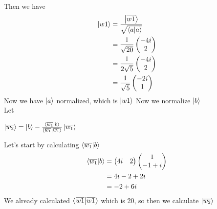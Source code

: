 \documentclass{article}
\begin{document}
Then we have\\
\begin{align*}
\ket{w1} &= \frac{\ket{\overline{w1}}}{\sqrt{\bra{a}\ket{a}}}\\
&= \frac{1}{\sqrt{20}}\begin{pmatrix} -4i \\ 2\end{pmatrix}\\
&= \frac{1}{2\sqrt{5}}\begin{pmatrix} -4i \\ 2\end{pmatrix}\\
&= \frac{1}{\sqrt{5}}\begin{pmatrix} -2i \\ 1\end{pmatrix}\\
\end{align*}
Now we have $\ket{a}$ normalized, which is $\ket{w1}$ Now we normalize $\ket{b}$\\
Let\\
\begin{center}
$\ket{\overline{w_2}} = \ket{b} - \frac{\bra{\overline{w_1}}\ket{b}}{\bra{\overline{w_1}}\ket{\overline{w_1}}} \ket{\overline{w_1}}$
\end{center}
Let's start by calculating $\bra{\overline{w_1}}\ket{b}$\\
\begin{align*}
\bra{\overline{w_1}}\ket{b} &= \begin{pmatrix} 4i & 2\end{pmatrix} \begin{pmatrix} 1 \\ -1+i\end{pmatrix}\\
&= 4i -2 + 2i\\
&= -2 + 6i
\end{align*}
We already calculated $\bra{\overline{w1}}\ket{\overline{w1}}$ which is 20, so then we calculate $\ket{\overline{w_2}}$\\
\end{document}
